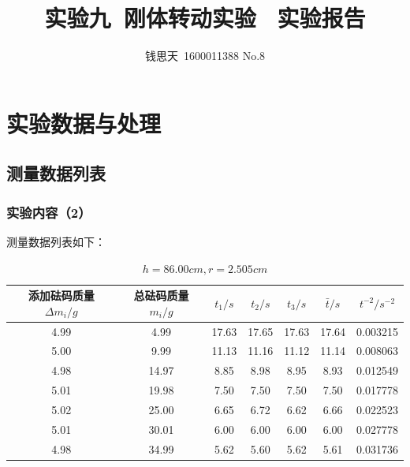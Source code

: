 \documentclass{ctexart}
\author{钱思天\ 1600011388 No.8}
\title{实验九\ 刚体转动实验 \ 实验报告}
\begin{document}
      \maketitle
      \section{实验数据与处理}
      \subsection{测量数据列表}
      \subsubsection{实验内容（2）}
      测量数据列表如下：
\begin{table}[H]
  \centering
  \caption{$h=86.00cm,r=2.505cm$}
  \resizebox{\textwidth}{!}
  {
    \begin{tabular}{|c|c|c|c|c|c|c|}\hline
    {添加砝码质量$\Delta m_i/g$} & {总砝码质量$m_i/g$} & {$t_1/s$} & {$t_2/s$} & {$t_3/s$} & {$\bar{t}/s$} & {$t^{-2}/s^{-2}$} \\\hline
    4.99  & 4.99  & 17.63 & 17.65 & 17.63 & 17.64 & 0.003215 \\\hline
    5.00  & 9.99  & 11.13 & 11.16 & 11.12 & 11.14 & 0.008063 \\\hline
    4.98  & 14.97  & 8.85  & 8.98  & 8.95  & 8.93  & 0.012549 \\\hline
    5.01  & 19.98  & 7.50  & 7.50  & 7.50  & 7.50  & 0.017778 \\\hline
    5.02  & 25.00  & 6.65  & 6.72  & 6.62  & 6.66  & 0.022523 \\\hline
    5.01  & 30.01  & 6.00  & 6.00  & 6.00  & 6.00  & 0.027778 \\\hline
    4.98  & 34.99  & 5.62  & 5.60  & 5.62  & 5.61  & 0.031736 \\\hline
    \end{tabular}%
  }
  \label{tab:addlabel}%
\end{table}%
\end{document}
